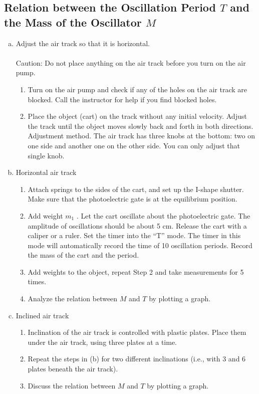 \documentclass{article}
\begin{document}
\subsection{Relation between the Oscillation Period $T$ and the Mass of the Oscillator $M$}

\begin{enumerate}[(a)]
\item
Adjust the air track so that it is horizontal.\\
\\
Caution: Do not place anything on the air track before you turn on the air pump.
	\begin{enumerate}[1.]
	\item
	Turn on the air pump and check if any of the holes on the air track are blocked.
Call the instructor for help if you find blocked holes.
	\item
	Place the object (cart) on the track without any initial velocity. Adjust the track
until the object moves slowly back and forth in both directions.\\
	Adjustment method. The air track has three knobs at the bottom: two on one side
and another one on the other side. You can only adjust that single knob.
	\end{enumerate}
	
\item
Horizontal air track
	\begin{enumerate}[1.]
	\item
	Attach springs to the sides of the cart, and set up the I-shape shutter. Make sure
that the photoelectric gate is at the equilibrium position.
	\item
	Add weight $m_1$ . Let the cart oscillate about the photoelectric gate. The amplitude
of oscillations should be about 5 cm. Release the cart with a caliper or a ruler. Set
the timer into the ``T'' mode. The timer in this mode will automatically record
the time of 10 oscillation periods. Record the mass of the cart and the period.
	\item
	Add weights to the object, repeat Step 2 and take measurements for 5 times.
	\item
	Analyze the relation between $M$ and $T$ by plotting a graph.
	\end{enumerate}
	
\item
Inclined air track
	\begin{enumerate}[1.]
	\item
	Inclination of the air track is controlled with plastic plates. Place them under the
air track, using three plates at a time.
	\item
	Repeat the steps in (b) for two different inclinations (i.e., with 3 and 6 plates beneath the air track).
	\item
	Discuss the relation between $M$ and $T$ by plotting a graph.
	\end{enumerate}
		
\end{enumerate}
\end{document}

